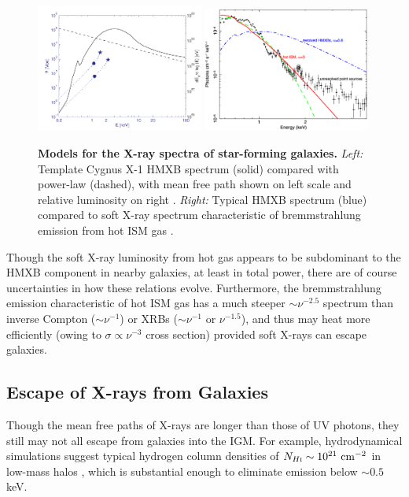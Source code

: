 \begin{figure}[]
\begin{center}
\includegraphics[width=0.49\textwidth]{Mirocha/fialkov2014_cygx1.pdf}
\includegraphics[width=0.49\textwidth]{Mirocha/pacucci2014_fig1.pdf}
\end{center}
\caption{{\bf Models for the X-ray spectra of star-forming galaxies.} \textit{Left:} Template Cygnus X-1 HMXB spectrum (solid) compared with power-law (dashed), with mean free path shown on left scale and relative luminosity on right \cite{Fialkov2014b}. \textit{Right:} Typical HMXB spectrum (blue) compared to soft X-ray spectrum characteristic of bremmstrahlung emission from hot ISM gas \cite{Pacucci2014}.}
\label{fig:xray_seds}
\end{figure}

Though the soft X-ray luminosity from hot gas appears to be subdominant to the HMXB component in nearby galaxies, at least in total power, there are of course uncertainties in how these relations evolve. Furthermore, the bremmstrahlung emission characteristic of hot ISM gas has a much steeper $\sim \nu^{-2.5}$ spectrum than inverse Compton ($\sim \nu^{-1}$) or XRBs ($\sim \nu^{-1}$ or $\nu^{-1.5}$), and thus may heat more efficiently (owing to $\sigma \propto \nu^{-3}$ cross section) provided soft X-rays can escape galaxies. 

\subsection{Escape of X-rays from Galaxies} \label{sec:xray_esc}
Though the mean free paths of X-rays are longer than those of UV photons, they still may not all escape from galaxies into the IGM. For example, hydrodynamical simulations suggest typical hydrogen column densities of $\NHI \sim 10^{21} \ \mathrm{cm}^{-2}$ in low-mass halos \cite{Das2017}, which is substantial enough to eliminate emission below $\sim 0.5$ keV. 

